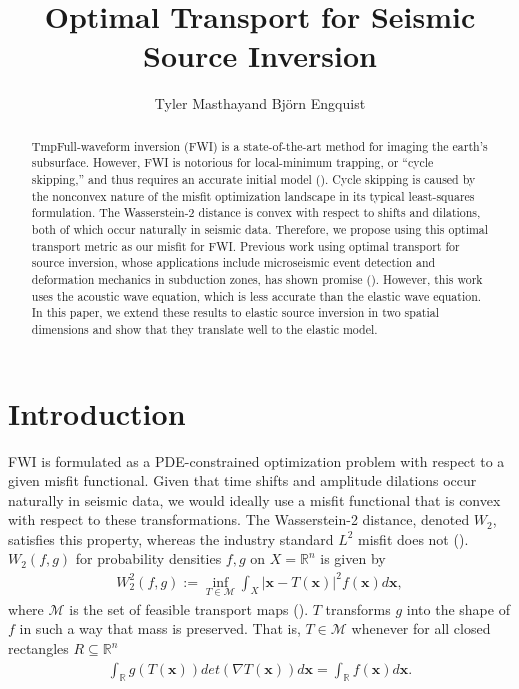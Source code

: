\documentclass[paper,onecolumn,twoside]{geophysics}
\newcommand{\citensp}[1]{\hspace{1sp}\cite{#1}}
\newcommand{\bs}[1]{\boldsymbol{#1}}
\newcommand{\R}{\mathbb{R}}
\begin{document}
\title{Optimal Transport for Seismic Source Inversion}

\renewcommand{\thefootnote}{\fnsymbol{footnote}} 

\address{
\footnotemark[1] Oden Institute, 
The University of Texas at Austin}
\author{Tyler Masthay\footnotemark[1] and Bj\"{o}rn Engquist\footnotemark[1]}



\begin{abstract}
TmpFull-waveform inversion (FWI) is a state-of-the-art method for imaging the earth's subsurface. However, FWI is notorious for local-minimum trapping, or ``cycle skipping,'' and thus requires an accurate initial model (\citensp{metivier2018optimal}).
Cycle skipping is caused by the nonconvex nature of the misfit optimization landscape in its typical least-squares formulation.
The Wasserstein-2 distance is convex with respect to shifts and dilations, both of which occur naturally in seismic data. Therefore, we propose using this optimal transport metric as our misfit for FWI. 
Previous work using optimal transport for source inversion, whose applications include microseismic event detection and deformation mechanics in subduction zones, has shown promise (\citensp{chen2018quadratic}). However, this work uses the acoustic wave equation, which is less accurate than the elastic wave equation.
In this paper, we extend these results to elastic source inversion in two spatial dimensions and show that they translate well to the elastic model.
\end{abstract}

\section{Introduction}
FWI is formulated as a PDE-constrained optimization problem with respect to a given misfit functional. Given that time shifts and amplitude dilations occur naturally in seismic data, we would ideally use a misfit functional that is convex with respect to these transformations. The Wasserstein-2 distance, denoted $W_2$, satisfies this property, whereas the industry standard $L^2$ misfit does not (\citensp{yang2018analysis}). 
$W_2(f,g)$ for probability densities $f,g$ on $X=\mathbb{R}^{n}$ is given by
\begin{align} \label{eqn:w2}
    W_2^2(f,g) := \inf_{T \in \mathcal{M}} \int_{X} |\bs{x} - T(\bs{x})|^2 f(\bs{x}) d\bs{x},
\end{align}
where $\mathcal{M}$ is the set of feasible transport maps (\citensp{villani2021topics}). $T$ transforms $g$ into the shape of $f$ in such a way that mass is preserved. That is, $T \in \mathcal{M}$ whenever for all closed rectangles $R \subseteq \mathbb{R}^{n}$
\begin{align*}
    \int_{\R} g(T(\bs{x})) det(\nabla T(\bs{x})) d\bs{x} = \int_{\R} f(\bs{x}) d\bs{x}.
\end{align*}
\end{document}
